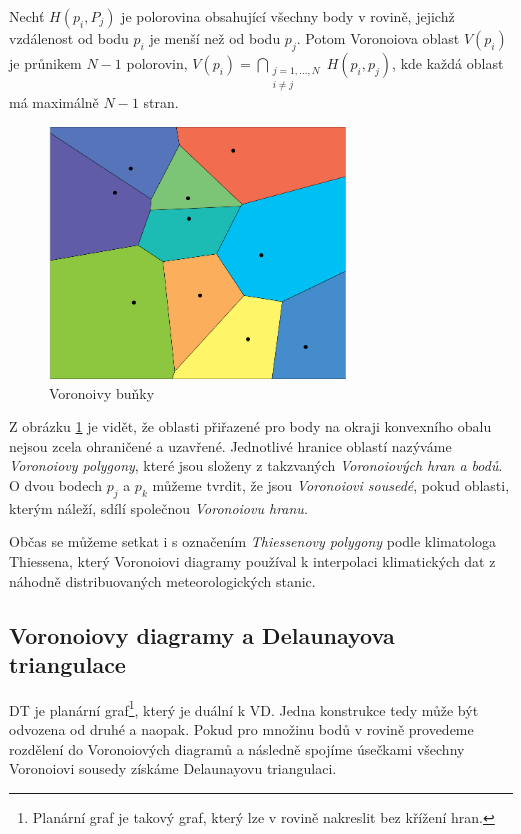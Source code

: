 \documentclass[12pt,a4paper]{article}
\begin{document}
Nechť $H(p_i,P_j)$ je polorovina obsahující všechny body v rovině,
jejichž vzdálenost od bodu $p_i$ je menší než od bodu $p_j$. Potom
Voronoiova oblast $V(p_i)$ je průnikem $N-1$ polorovin,
$V(p_i)= \bigcap\limits_{\substack{j=1,...,N \\ i\not=j}}H(p_i,p_j)$,
kde každá oblast má maximálně $N-1$ stran.

\newpage
\begin{figure}[h!]
\centering
\includegraphics[width=0.7\textwidth]{img/vor_pol.png}
\caption{Voronoivy buňky}
\label{fig:vor_pol}
\end{figure}

Z obrázku \ref{fig:vor_pol} je vidět, že oblasti přiřazené pro body na
okraji konvexního obalu nejsou zcela ohraničené a uzavřené. Jednotlivé
hranice oblastí nazýváme \emph{Voronoiovy polygony}, které jsou
složeny z takzvaných \emph{Voronoiových hran a bodů}. O dvou bodech
$p_j$ a $p_k$ můžeme tvrdit, že jsou \emph{Voronoiovi sousedé}, pokud
oblasti, kterým náleží, sdílí společnou \emph{Voronoiovu hranu}.

Občas se můžeme setkat i s označením \emph{Thiessenovy polygony} podle
klimatologa Thiessena, který Voronoiovi diagramy používal k
interpolaci klimatických dat z náhodně distribuovaných
meteorologických stanic.

\newpage
\subsection{Voronoiovy diagramy a Delaunayova triangulace}
\label{sub:VDaDT}

DT je planární graf\footnote{Planární graf je takový graf, který lze v rovině nakreslit bez křížení hran.}, který je duální k VD. Jedna konstrukce tedy může
být odvozena od druhé a naopak.  Pokud pro množinu bodů v rovině
provedeme rozdělení do Voronoiových diagramů a následně spojíme
úsečkami všechny Voronoiovi sousedy získáme Delaunayovu triangulaci.
\end{document}
